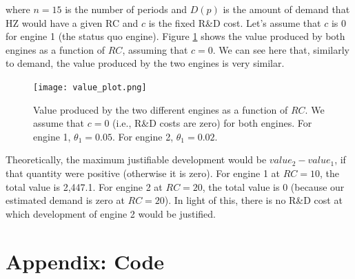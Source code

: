 \documentclass[paper=a4, fontsize=11pt]{scrartcl} %
\numberwithin{equation}{section} %
\numberwithin{figure}{section} %
\numberwithin{table}{section} %
\newcommand{\mylisting}[2][]{%
}
\begin{document}
\begin{itemize}
\begin{itemize}
\noindent where $n=15$ is the number of periods and $D(p)$ is the amount of demand that HZ would have a given RC and $c$ is the fixed R\&D cost. Let's assume that $c$ is 0 for engine 1 (the status quo engine). Figure \ref{fig:value_plot} shows the value produced by both engines as a function of $RC$, assuming that $c = 0$. We can see here that, similarly to demand, the value produced by the two engines is very similar.

\begin{figure}[ht!]
\centering
	\texttt{[image: value\_plot.png]}
\caption{Value produced by the two different engines as a function of $RC$. We assume that $c = 0$ (i.e., R\&D costs are zero) for both engines. For engine 1, $\theta_1 = 0.05$. For engine 2, $\theta_1 = 0.02$.}
\label{fig:value_plot}
\end{figure}

Theoretically, the maximum justifiable development would be $value_2 - value_1$, if that quantity were positive (otherwise it is zero). For engine 1 at $RC = 10$, the total value is 2,447.1. For engine 2 at $RC = 20$, the total value is 0 (because our estimated demand is zero at $RC=20$). In light of this, there is no R\&D cost at which development of engine 2 would be justified. 

\end{itemize}

\end{itemize}

\newpage
\section*{Appendix: Code}

\mylisting[language=R]{./rust.R}



\end{document}
